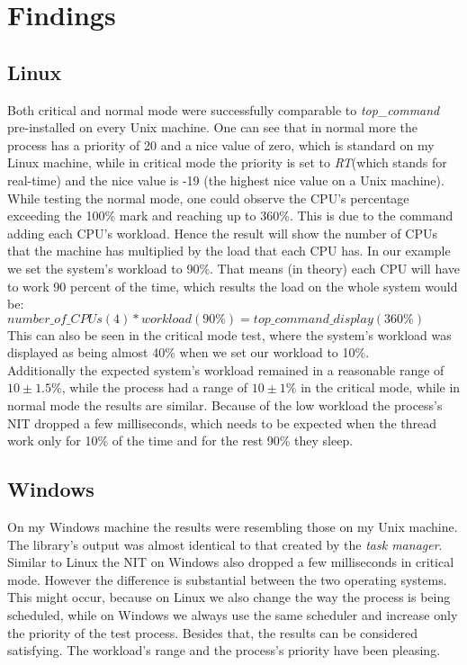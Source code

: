\section{Findings}
\subsection{Linux}
Both critical and normal mode were successfully comparable to \textit{top\_command} pre-installed on every Unix machine. One can see that in normal more the process has a priority of 20 and a nice value of zero, which is standard on my Linux machine, while in critical mode the priority is set to \textit{RT}(which stands for real-time) and the nice value is -19 (the highest nice value on a Unix machine).\\
While testing the normal mode, one could observe the CPU's percentage exceeding the 100\% mark and reaching up to 360\%. This is due to the command adding each CPU's workload. Hence the result will show the number of CPUs that the machine has multiplied by the load that each CPU has. In our example we set the system's workload to 90\%. That means (in theory) each CPU will have to work 90 percent of the time, which results the load on the whole system would be:\vspace{1mm}\\
$number\_of\_CPUs(4) * workload(90\%) = top\_command\_display(360\%)$
\vspace{1mm}\\
This can also be seen in the critical mode test, where the system's workload was displayed as being almost 40\% when we set our workload to 10\%.\\
Additionally the expected system's workload remained in a reasonable range of $10 \pm 1.5\%$, while the process had a range of $10 \pm 1\%$ in the critical mode, while in normal mode the results are similar. Because of the low workload the process's NIT dropped a few milliseconds, which needs to be expected when the thread work only for 10\% of the time and for the rest 90\% they sleep.
\subsection{Windows}
On my Windows machine the results were resembling those on my Unix machine. The library's output was almost identical to that created by the \textit{task manager}. Similar to Linux the NIT on Windows also dropped a few milliseconds in critical mode. However the difference is substantial between the two operating systems. This might occur, because on Linux we also change the way the process is being scheduled, while on Windows we always use the same scheduler and increase only the priority of the test process. Besides that, the results can be considered satisfying. The workload's range and the process's priority have been pleasing.